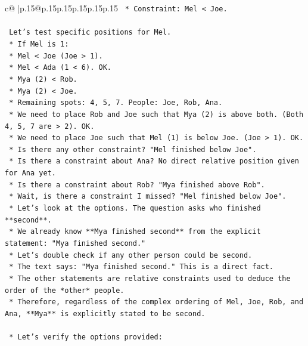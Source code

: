 \documentclass{article}
\begin{document}
{\begin{supertabular}{c@{$\;$}|p{.15\linewidth}@{}p{.15\linewidth}p{.15\linewidth}p{.15\linewidth}p{.15\linewidth}p{.15\linewidth}}
{{{\texttt{        *   Constraint: Mel < Joe.} \\
\\ 
\texttt{        Let's test specific positions for Mel.} \\
\texttt{        *   If Mel is 1:} \\
\texttt{            *   Mel < Joe (Joe > 1).} \\
\texttt{            *   Mel < Ada (1 < 6). OK.} \\
\texttt{            *   Mya (2) < Rob.} \\
\texttt{            *   Mya (2) < Joe.} \\
\texttt{            *   Remaining spots: 4, 5, 7. People: Joe, Rob, Ana.} \\
\texttt{            *   We need to place Rob and Joe such that Mya (2) is above both. (Both 4, 5, 7 are > 2). OK.} \\
\texttt{            *   We need to place Joe such that Mel (1) is below Joe. (Joe > 1). OK.} \\
\texttt{            *   Is there any other constraint? "Mel finished below Joe".} \\
\texttt{            *   Is there a constraint about Ana? No direct relative position given for Ana yet.} \\
\texttt{            *   Is there a constraint about Rob? "Mya finished above Rob".} \\
\texttt{            *   Wait, is there a constraint I missed? "Mel finished below Joe".} \\
\texttt{            *   Let's look at the options. The question asks who finished **second**.} \\
\texttt{            *   We already know **Mya finished second** from the explicit statement: "Mya finished second."} \\
\texttt{            *   Let's double check if any other person could be second.} \\
\texttt{            *   The text says: "Mya finished second." This is a direct fact.} \\
\texttt{            *   The other statements are relative constraints used to deduce the order of the *other* people.} \\
\texttt{            *   Therefore, regardless of the complex ordering of Mel, Joe, Rob, and Ana, **Mya** is explicitly stated to be second.} \\
\\ 
\texttt{    *   Let's verify the options provided:} \\
}}}
\end{supertabular}}
\end{document}
